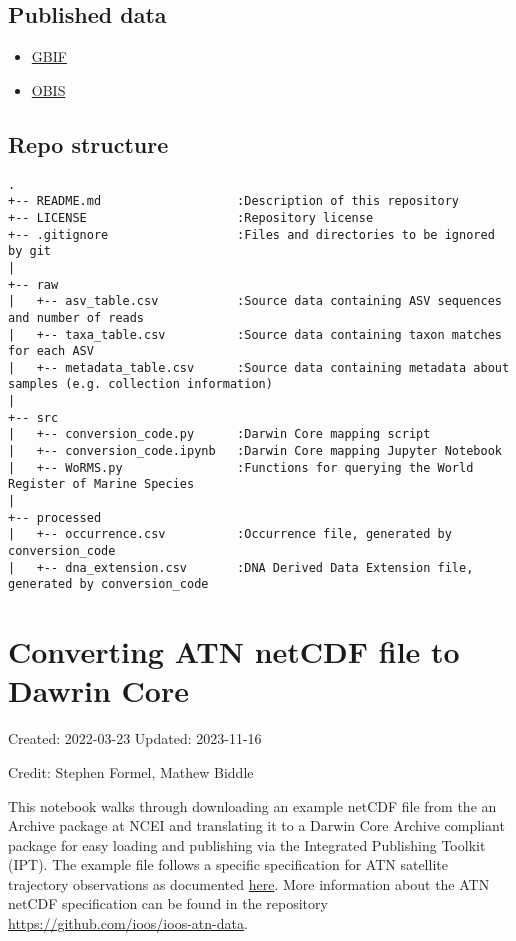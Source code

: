 \documentclass[
]{book}
\providecommand{\tightlist}{%
  \setlength{\itemsep}{0pt}\setlength{\parskip}{0pt}}
\begin{document}
\hypertarget{published-data}{%
\subsection{Published data}\label{published-data}}

\begin{itemize}
\tightlist
\item
  \href{https://www.gbif.org/dataset/e0b59ee7-19ae-4eb0-9217-33317fb50d47}{GBIF}
\item
  \href{https://obis.org/dataset/62b97724-da17-4ca7-9b26-b2a22aeaab51}{OBIS}
\end{itemize}

\hypertarget{repo-structure}{%
\subsection{Repo structure}\label{repo-structure}}

\begin{verbatim}
.
+-- README.md                   :Description of this repository
+-- LICENSE                     :Repository license
+-- .gitignore                  :Files and directories to be ignored by git
|
+-- raw
|   +-- asv_table.csv           :Source data containing ASV sequences and number of reads
|   +-- taxa_table.csv          :Source data containing taxon matches for each ASV
|   +-- metadata_table.csv      :Source data containing metadata about samples (e.g. collection information)
|
+-- src
|   +-- conversion_code.py      :Darwin Core mapping script
|   +-- conversion_code.ipynb   :Darwin Core mapping Jupyter Notebook
|   +-- WoRMS.py                :Functions for querying the World Register of Marine Species
|
+-- processed
|   +-- occurrence.csv          :Occurrence file, generated by conversion_code
|   +-- dna_extension.csv       :DNA Derived Data Extension file, generated by conversion_code
\end{verbatim}

\hypertarget{converting-atn-netcdf-file-to-dawrin-core}{%
\section{Converting ATN netCDF file to Dawrin Core}\label{converting-atn-netcdf-file-to-dawrin-core}}

Created: 2022-03-23
Updated: 2023-11-16

Credit: Stephen Formel, Mathew Biddle

This notebook walks through downloading an example netCDF file from the an Archive package at NCEI and translating it to a Darwin Core Archive compliant package for easy loading and publishing via the Integrated Publishing Toolkit (IPT). The example file follows a specific specification for ATN satellite trajectory observations as documented \href{https://github.com/ioos/ioos-atn-data/blob/main/templates/atn_trajectory_template.cdl}{here}. More information about the ATN netCDF specification can be found in the repository \url{https://github.com/ioos/ioos-atn-data}.
\end{document}
